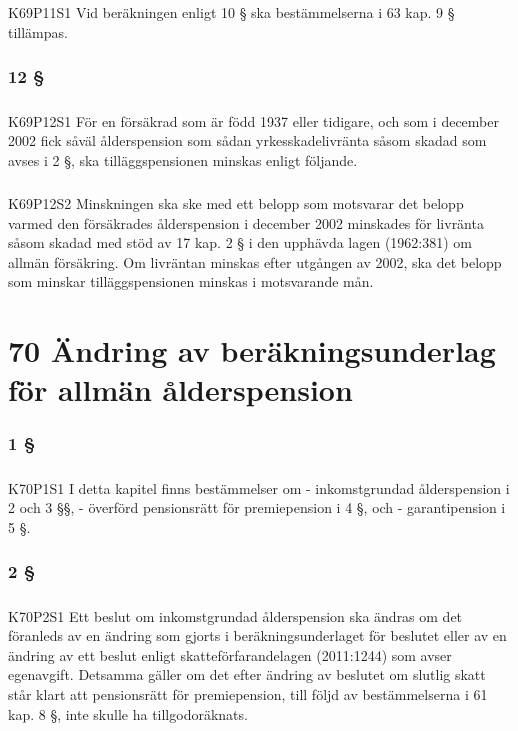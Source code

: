 \documentclass[a4paper,notitlepage,openany,10pt]{book}
\begin{document}
\paragraph*{}
{\tiny K69P11S1}
Vid beräkningen enligt 10 § ska bestämmelserna i 63 kap. 9 § tillämpas.
\subsection*{12 §}
\paragraph*{}
{\tiny K69P12S1}
För en försäkrad som är född 1937 eller tidigare, och som i december 2002 fick såväl ålderspension som sådan yrkesskadelivränta såsom skadad som avses i 2 §, ska tilläggspensionen minskas enligt följande.
\paragraph*{}
{\tiny K69P12S2}
Minskningen ska ske med ett belopp som motsvarar det belopp varmed den försäkrades ålderspension i december 2002 minskades för livränta såsom skadad med stöd av 17 kap. 2 § i den upphävda lagen (1962:381) om allmän försäkring. Om livräntan minskas efter utgången av 2002, ska det belopp som minskar tilläggspensionen minskas i motsvarande mån.
\chapter*{70 Ändring av beräkningsunderlag för allmän ålderspension}
\subsection*{1 §}
\paragraph*{}
{\tiny K70P1S1}
I detta kapitel finns bestämmelser om
\newline - inkomstgrundad ålderspension i 2 och 3 §§,
\newline - överförd pensionsrätt för premiepension i 4 §, och
\newline - garantipension i 5 §.
\subsection*{2 §}
\paragraph*{}
{\tiny K70P2S1}
Ett beslut om inkomstgrundad ålderspension ska ändras om det föranleds av en ändring som gjorts i beräkningsunderlaget för beslutet eller av en ändring av ett beslut enligt skatteförfarandelagen (2011:1244) som avser egenavgift.
Detsamma gäller om det efter ändring av beslutet om slutlig skatt står klart att pensionsrätt för premiepension, till följd av bestämmelserna i 61 kap. 8 §, inte skulle ha tillgodoräknats.
\end{document}
